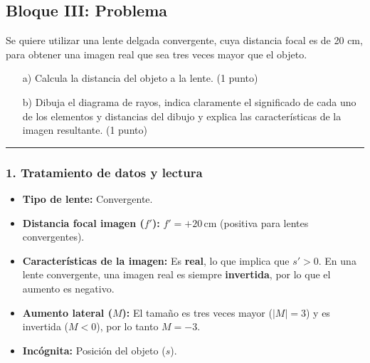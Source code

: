 \newpage

\subsection{Bloque III: Problema}
\label{subsec:B3_2012_jun_ord}
\begin{cajaenunciado}
Se quiere utilizar una lente delgada convergente, cuya distancia focal es de 20 cm, para obtener una imagen real que sea tres veces mayor que el objeto.
\begin{enumerate}
    \item[a)] Calcula la distancia del objeto a la lente. (1 punto)
    \item[b)] Dibuja el diagrama de rayos, indica claramente el significado de cada uno de los elementos y distancias del dibujo y explica las características de la imagen resultante. (1 punto)
\end{enumerate}
\end{cajaenunciado}
\hrule

\subsubsection*{1. Tratamiento de datos y lectura}
\begin{itemize}
    \item \textbf{Tipo de lente:} Convergente.
    \item \textbf{Distancia focal imagen ($f'$):} $f' = +20\,\text{cm}$ (positiva para lentes convergentes).
    \item \textbf{Características de la imagen:} Es \textbf{real}, lo que implica que $s'>0$. En una lente convergente, una imagen real es siempre \textbf{invertida}, por lo que el aumento es negativo.
    \item \textbf{Aumento lateral ($M$):} El tamaño es tres veces mayor ($|M|=3$) y es invertida ($M<0$), por lo tanto $M = -3$.
    \item \textbf{Incógnita:} Posición del objeto ($s$).
\end{itemize}

